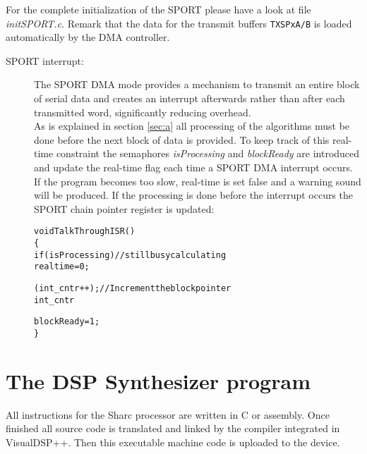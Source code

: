 For the complete initialization of the SPORT please have a look at file \emph{initSPORT.c}. Remark that the data for the transmit buffers \verb+TXSPxA/B+ is loaded automatically by the DMA controller.\\

\begin{description}
\item[SPORT interrupt:] The SPORT DMA mode provides a mechanism to transmit an entire block of serial data and creates an interrupt afterwards rather than after each transmitted word, significantly reducing overhead. \\
As is explained in section \ref{sec:a} all processing of the algorithms must be done before the next block of data is provided. To keep track of this real-time constraint the semaphores \emph{isProcessing} and \emph{blockReady} are introduced and update the real-time flag each time a SPORT DMA interrupt occurs. If the program becomes too slow, real-time is set false and a warning sound will be produced. If the processing is done before the interrupt occurs the SPORT chain pointer register is updated:
\begin{alltt}
	void TalkThroughISR()
	\{
		    if(isProcessing) //still busy calculating
		    realtime=0;
    
		    (int_cntr++);		//Increment the block pointer
		    int_cntr %= 3;
	
		    blockReady = 1;
	\}
\end{alltt}
\end{description}
\section{The DSP Synthesizer program}
All instructions for the Sharc processor are written in C or assembly. Once finished all source code is translated and linked by the compiler integrated in VisualDSP++. Then this executable machine code is uploaded to the device.

